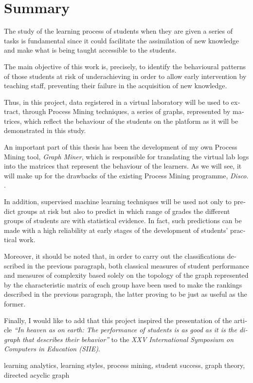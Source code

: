 \chapter*{Summary}

\begin{otherlanguage}{english}

The study of the learning process of students when they are given a series of tasks is fundamental since it could facilitate the assimilation of new knowledge and make what is being taught accessible to the students.

The main objective of this work is, precisely, to identify the behavioural patterns of those students at risk of underachieving in order to allow early intervention by teaching staff, preventing their failure in the acquisition of new knowledge.

Thus, in this project, data registered in a virtual laboratory will be used to extract, through Process Mining techniques, a series of graphs, represented by matrices, which reflect the behaviour of the students on the platform as it will be demonstrated in this study.

An important part of this thesis has been the development of my own Process Mining tool, \emph{Graph Miner}, which is responsible for translating the virtual lab logs into the matrices that represent the behaviour of the learners. As we will see, it will make up for the drawbacks of the existing Process Mining programme, \emph{Disco}. \cite{gunther2012disco}.

In addition, supervised machine learning techniques will be used not only to predict groups at risk but also to predict in which range of grades the different groups of students are with statistical evidence. In fact, such predictions can be made with a high reliability at early stages of the development of students' practical work.

Moreover, it should be noted that, in order to carry out the classifications described in the previous paragraph, both classical measures of student performance and measures of complexity based solely on the topology of the graph represented by the characteristic matrix of each group have been used to make the rankings described in the previous paragraph, the latter proving to be just as useful as the former.

Finally, I would like to add that this project inspired the presentation of the article \emph{``In heaven as on earth: The performance of students is as good as it is the digraph that describes their behavior''} \cite{SIIE23} to the \emph{XXV International Symposium on Computers in Education (SIIE)}.

\small{ learning analytics, \; learning styles, \; process mining, \; student success, \; graph theory, \; directed acyclic graph}

\end{otherlanguage}